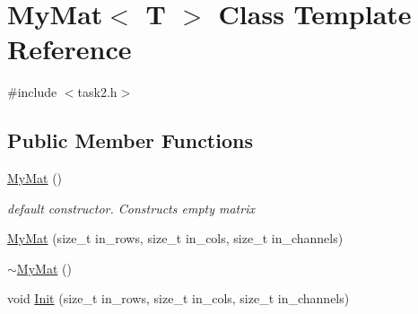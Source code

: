 \hypertarget{class_my_mat}{}\section{My\+Mat$<$ T $>$ Class Template Reference}
\label{class_my_mat}


{\ttfamily \#include $<$task2.\+h$>$}

\subsection*{Public Member Functions}
\begin{DoxyCompactItemize}
\item 
\hypertarget{class_my_mat_ac1302036a224f5dbe0551237a4ae62fd}{}\hyperlink{class_my_mat_ac1302036a224f5dbe0551237a4ae62fd}{My\+Mat} ()\label{class_my_mat_ac1302036a224f5dbe0551237a4ae62fd}

\begin{DoxyCompactList}\small\item\em default constructor. Constructs empty matrix \end{DoxyCompactList}\item 
\hyperlink{class_my_mat_a9321ac5b90734babfe503a7872d9a896}{My\+Mat} (size\+\_\+t in\+\_\+rows, size\+\_\+t in\+\_\+cols, size\+\_\+t in\+\_\+channels)
\item 
\hyperlink{class_my_mat_a54a996cebad56ef0fd241c5fd36457cb}{$\sim$\+My\+Mat} ()
\item 
void \hyperlink{class_my_mat_a1c26f8f283f64b5c8a21459ad2bf4507}{Init} (size\+\_\+t in\+\_\+rows, size\+\_\+t in\+\_\+cols, size\+\_\+t in\+\_\+channels)
\end{DoxyCompactItemize}

